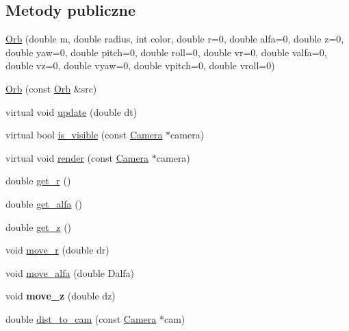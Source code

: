 \subsection*{Metody publiczne}
\begin{DoxyCompactItemize}
\item 
\hyperlink{class_orb_a3407825c339b82eaff3b59738670350a}{Orb} (double m, double radius, int color, double r=0, double alfa=0, double z=0, double yaw=0, double pitch=0, double roll=0, double vr=0, double valfa=0, double vz=0, double vyaw=0, double vpitch=0, double vroll=0)
\item 
\hyperlink{class_orb_adeeb210501049c0d1a2e1a5c4761c8c8}{Orb} (const \hyperlink{class_orb}{Orb} \&src)
\item 
virtual void \hyperlink{class_orb_a23637b6caf496f4932e21935edbd1b74}{update} (double dt)
\item 
virtual bool \hyperlink{class_orb_af96db026919a527193c96331444a04df}{is\+\_\+visible} (const \hyperlink{class_camera}{Camera} $\ast$camera)
\item 
virtual void \hyperlink{class_orb_ade7e6c6c2a991d91c2420581996e0b17}{render} (const \hyperlink{class_camera}{Camera} $\ast$camera)
\item 
double \hyperlink{class_orb_a5b6bfbf0f482b6876458c208c762c5f6}{get\+\_\+r} ()
\item 
double \hyperlink{class_orb_a2da0c0c6302143398ae204ad2a13d17f}{get\+\_\+alfa} ()
\item 
double \hyperlink{class_orb_a01147493b605751d3176faf78ec97f0d}{get\+\_\+z} ()
\item 
void \hyperlink{class_orb_a365261dff002736017e9fc0d346e2fbf}{move\+\_\+r} (double dr)
\item 
void \hyperlink{class_orb_ada00a09e2184aff67aba54c5cbf9d276}{move\+\_\+alfa} (double Dalfa)
\item 
void {\bfseries move\+\_\+z} (double dz)\hypertarget{class_orb_af25337025d9e1698689d395e22bad4e8}{}\label{class_orb_af25337025d9e1698689d395e22bad4e8}

\item 
double \hyperlink{class_orb_ab960dd2ce7a33bc4ec53a84780885085}{dist\+\_\+to\+\_\+cam} (const \hyperlink{class_camera}{Camera} $\ast$cam)
\end{DoxyCompactItemize}
